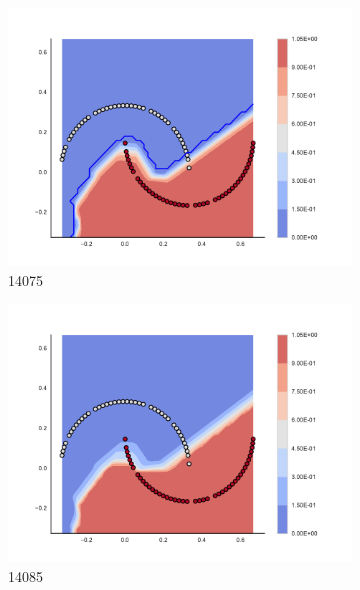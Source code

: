 \begin{figure}[h]
\begin{subfigure}[b]{0.09\textwidth}
    \includegraphics[clip, trim=2.35cm 1.75cm 4.5cm 0cm,width=\textwidth]{img/convergence/14075.pdf}
    \caption{14075}
    \label{fig:convergence_14075}
\end{subfigure}
%
\begin{subfigure}[b]{0.09\textwidth}
    \includegraphics[clip, trim=2.35cm 1.75cm 4.5cm 0cm,width=\textwidth]{img/convergence/14085.pdf}
    \caption{14085}
    \label{fig:convergence_14085}
\end{subfigure}
%
\begin{subfigure}[b]{0.09\textwidth}

\end{subfigure}
\end{figure}
